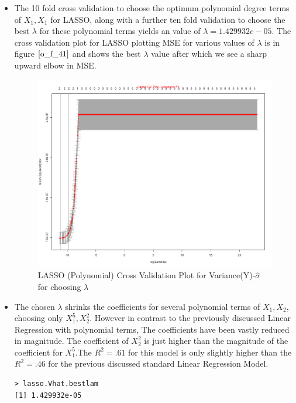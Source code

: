 \documentclass[twoside,12pt]{article}
\begin{document}
\begin{itemize}
\FloatBarrier
\item
The 10 fold cross validation to choose the optimum polynomial degree terms of $X_1,X_1$ for LASSO, along with a further ten fold validation to choose the best $\lambda$ for these polynomial terms yields an value of $\lambda=1.429932e-05$. The cross validation plot for LASSO plotting MSE for various values of $\lambda$ is in figure $\eqref{o_f_41}$ and shows the best $\lambda$ value after which we see a sharp upward elbow in MSE.
\FloatBarrier
\begin{figure}[!htbp]
\centering
\includegraphics[scale=.50]{images/lasso_cv_plot_v.png} 
\caption{LASSO (Polynomial) Cross Validation Plot for Variance(Y)-$\hat{\sigma}$ for choosing $\lambda$}
\label{o_f_41}
\end{figure}

\FloatBarrier
\item
The chosen $\lambda$ shrinks the coefficients for several polynomial terms of $X_1,X_2$, choosing only $X_1^5,X_2^2$. However in contrast to the previously discussed Linear Regression with polynomial terms, The coefficients have been vastly reduced in magnitude. The coefficient of $X_2^2$ is just  higher than the magnitude of the coefficient for $X_1^5$.The $R^2=.61$ for this model is only slightly higher than the $R^2=.46$ for the previous discussed standard Linear Regression Model.

\begin{verbatim}
> lasso.Vhat.bestlam
[1] 1.429932e-05




\end{verbatim}
\end{itemize}
\end{document}
